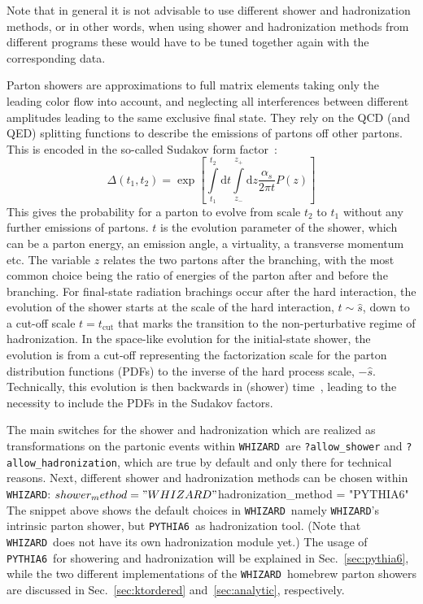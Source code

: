 \documentclass[12pt]{book}
\newenvironment{code}%
  {\begingroup\footnotesize
   \quote
   \Verbatim}%
  {\endVerbatim
   \endquote
   \endgroup\noindent}
\newcommand{\ttt}[1]{\texttt{#1}}
\newcommand{\whizard}{\ttt{WHIZARD}}
\newcommand{\pythiasix}{\ttt{PYTHIA6}}
\begin{document}
Note that in general it is not advisable to use different shower and
hadronization methods, or in other words, when using shower and
hadronization methods from different programs these would have to be
tuned together again with the corresponding data.

Parton showers are approximations to full matrix elements taking only
the leading color flow into account, and neglecting all interferences
between different amplitudes leading to the same exclusive final
state. They rely on the QCD (and QED) splitting functions to describe
the emissions of partons off other partons. This is encoded in the
so-called Sudakov form factor~\cite{Sudakov:1954sw}:
\begin{equation*}
  \Delta( t_1, t_2) = \exp \left[ \int\limits_{t_1}^{t_2} \mbox{d} t
    \int\limits_{z_-}^{z_+} \mbox{d} z \frac{\alpha_s}{2 \pi t} P(z)
    \right]
\end{equation*}
This gives the probability for a parton to evolve from scale $t_2$ to
$t_1$ without any further emissions of partons. $t$ is the evolution
parameter of the shower, which can be a parton energy, an emission
angle, a virtuality, a transverse momentum etc. The variable $z$
relates the two partons after the branching, with the most common
choice being the ratio of energies of the parton after and before the
branching. For final-state radiation brachings occur after the hard
interaction, the evolution of the shower starts at the scale of the
hard interaction, $t \sim \hat{s}$, down to a cut-off scale $t =
t_{\text{cut}}$ that marks the transition to the non-perturbative
regime of hadronization. In the space-like evolution for the
initial-state shower, the evolution is from a cut-off representing the
factorization scale for the parton distribution functions (PDFs) to the
inverse of the hard process scale, $-\hat{s}$. Technically, this
evolution is then backwards in (shower) time~\cite{Sjostrand:1985xi},
leading to the necessity to include the PDFs in the Sudakov factors.

The main switches for the shower and hadronization which are realized
as transformations on the partonic events within \whizard\ are
\ttt{?allow\_shower} and \ttt{?allow\_hadronization}, which are
true by default and only there for technical reasons. Next, different
shower and hadronization methods can be chosen within \whizard:
\begin{code}
  $shower_method = "WHIZARD"
  $hadronization_method = "PYTHIA6"
\end{code}
The snippet above shows the default choices in \whizard\, namely
\whizard's intrinsic parton shower, but \pythiasix\ as hadronization
tool. (Note that \whizard\ does not have its own hadronization module
yet.)  The usage of \pythiasix\ for showering and hadronization will
be explained in Sec.~\ref{sec:pythia6}, while the two different
implementations of the \whizard\ homebrew parton showers are discussed
in Sec.~\ref{sec:ktordered} and~\ref{sec:analytic}, respectively.
\end{document}
